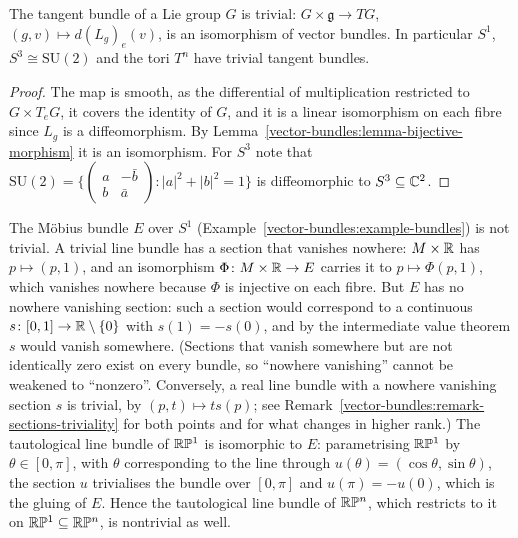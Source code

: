 \begin{proposition}\label{vector-bundles:proposition-lie-group-parallelisable}
The tangent bundle of a Lie group $G$ is trivial: $G \times \mathfrak{g} \to TG$, $(g, v) \mapsto d(L_g)_e(v)$, is an isomorphism of vector bundles. In particular $S^1$, $S^3 \cong \mathrm{SU}(2)$ and the tori $T^n$ have trivial tangent
bundles.
\end{proposition}

\begin{proof}
The map is smooth, as the differential of multiplication restricted to $G \times T_eG$, it covers the identity of $G$, and it is a linear isomorphism on each fibre since $L_g$ is a diffeomorphism. By
Lemma~\ref{vector-bundles:lemma-bijective-morphism} it is an isomorphism. For $S^3$ note that
$\mathrm{SU}(2) = \{\begin{pmatrix}a & -\bar b\\ b & \bar a\end{pmatrix} : |a|^2 + |b|^2 = 1\}$ is diffeomorphic to $S^3 \subseteq \mathbb{C}^2$.
\end{proof}

\begin{counterexample}\label{vector-bundles:counterexample-mobius}
The M\"obius bundle $E$ over $S^1$ (Example~\ref{vector-bundles:example-bundles}) is not trivial. A trivial line bundle has a section that vanishes nowhere: $M \times \mathbb{R}$ has $p \mapsto (p, 1)$, and an isomorphism $\Phi \colon M \times \mathbb{R} \to E$ carries it to
$p \mapsto \Phi(p, 1)$, which vanishes nowhere because $\Phi$ is injective on each fibre. But $E$ has no nowhere vanishing section: such a section would correspond to a continuous
$s \colon [0, 1] \to \mathbb{R} \setminus \{0\}$ with $s(1) = -s(0)$, and by the intermediate value theorem $s$ would vanish somewhere. (Sections that vanish somewhere but are not identically zero exist on every
bundle, so ``nowhere vanishing'' cannot be weakened to ``nonzero''. Conversely, a real line bundle with a nowhere vanishing section $s$ is trivial, by $(p, t) \mapsto ts(p)$; see
Remark~\ref{vector-bundles:remark-sections-triviality} for both points and for what changes in higher rank.) The tautological line bundle of $\mathbb{R}\mathbb{P}^1$ is isomorphic to $E$: parametrising
$\mathbb{R}\mathbb{P}^1$ by $\theta \in [0, \pi]$, with $\theta$ corresponding to the line through $u(\theta) = (\cos\theta, \sin\theta)$, the section $u$ trivialises the bundle over $[0, \pi]$ and $u(\pi) = -u(0)$, which is the gluing of $E$. Hence the
tautological line bundle of $\mathbb{R}\mathbb{P}^n$, which restricts to it on $\mathbb{R}\mathbb{P}^1 \subseteq \mathbb{R}\mathbb{P}^n$, is nontrivial as well.
\end{counterexample}

